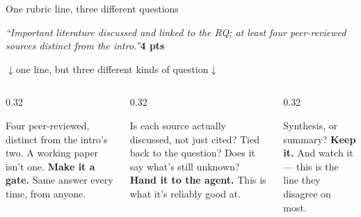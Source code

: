 \documentclass[aspectratio=169, 10pt]{beamer}
\begin{document}
\begin{frame}{One rubric line, three different questions}
\vskip2pt
\begin{center}
\begin{tcolorbox}[quotebox, width=0.93\textwidth, top=3pt, bottom=3pt]
\small
\textit{``Important literature discussed and linked to the RQ; at least four peer-reviewed sources distinct from the intro.''}\hfill\textbf{4 pts}
\end{tcolorbox}
\end{center}
\vskip3pt
\begin{center}{\color{CoolGray}\footnotesize $\downarrow$\qquad one line, but three different kinds of question\qquad $\downarrow$}\end{center}
\vskip4pt
\begin{columns}[T]
\begin{column}{0.32\textwidth}
\begin{tcolorbox}[dobox, title={\faCheck\quad Countable}, top=2pt, bottom=2pt]
\scriptsize
Four peer-reviewed, distinct from the intro's two. A working paper isn't one.
\vskip3pt
\textbf{Make it a gate.} Same answer every time, from anyone.
\end{tcolorbox}
\end{column}
\begin{column}{0.32\textwidth}
\begin{tcolorbox}[pipelinebox, title={\faSearch\quad Checkable}, fonttitle=\bfseries\small, top=2pt, bottom=2pt]
\scriptsize
Is each source actually discussed, not just cited? Tied back to the question? Does it say what's still unknown?
\vskip3pt
\textbf{Hand it to the agent.} This is what it's reliably good at.
\end{tcolorbox}
\end{column}
\begin{column}{0.32\textwidth}
\begin{tcolorbox}[accentbox, title={\faBalanceScale\quad Judgment}, fonttitle=\bfseries\small, coltitle=DeepCharcoal, colbacktitle=LightGold!80, top=2pt, bottom=2pt]
\scriptsize
Synthesis, or summary?
\vskip3pt
\textbf{Keep it.} And watch it --- this is the line they disagree on most.
\end{tcolorbox}
\end{column}
\end{columns}
\end{frame}
\end{document}
